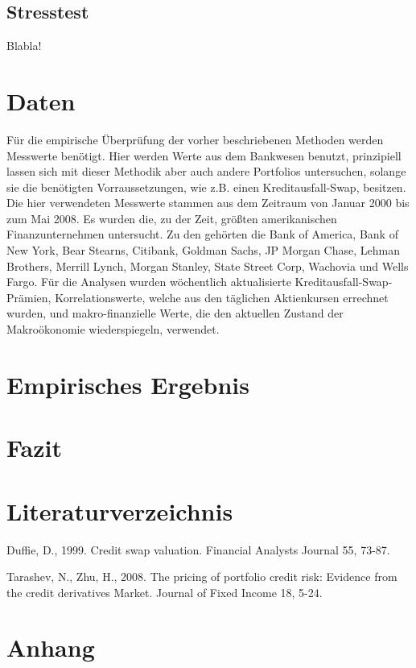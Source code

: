 \documentclass[a4paper,12pt]{scrartcl}
\begin{document}
\newpage
\subsection{Stresstest}

Blabla!
\newpage
\section{Daten}
Für die empirische Überprüfung der vorher beschriebenen Methoden werden Messwerte benötigt. Hier werden Werte aus dem Bankwesen benutzt, prinzipiell lassen sich mit dieser Methodik aber auch andere Portfolios untersuchen, solange sie die benötigten Vorraussetzungen, wie z.B. einen Kreditausfall-Swap, besitzen. 
Die hier verwendeten Messwerte stammen aus dem Zeitraum von Januar 2000 bis zum Mai 2008. Es wurden die, zu der Zeit, größten amerikanischen Finanzunternehmen untersucht. Zu den gehörten die Bank of America, Bank of New York, Bear Stearns, Citibank, Goldman Sachs, JP Morgan Chase, Lehman Brothers, Merrill Lynch, Morgan Stanley, State Street Corp, Wachovia und Wells Fargo. 
Für die Analysen wurden wöchentlich aktualisierte Kreditausfall-Swap-Prämien, Korrelationswerte, welche aus den täglichen Aktienkursen errechnet wurden, und makro-finanzielle Werte, die den aktuellen Zustand der Makroökonomie wiederspiegeln,  verwendet.

\newpage
\section{Empirisches Ergebnis}
\newpage
\section{Fazit}
\newpage
\section{Literaturverzeichnis}

Duffie, D., 1999. Credit swap valuation. Financial Analysts Journal 55, 73-87.

Tarashev, N., Zhu, H., 2008. The pricing of portfolio credit risk: Evidence from the credit derivatives Market. Journal of Fixed Income 18, 5-24.
\newpage

\section{Anhang}
\end{document}
